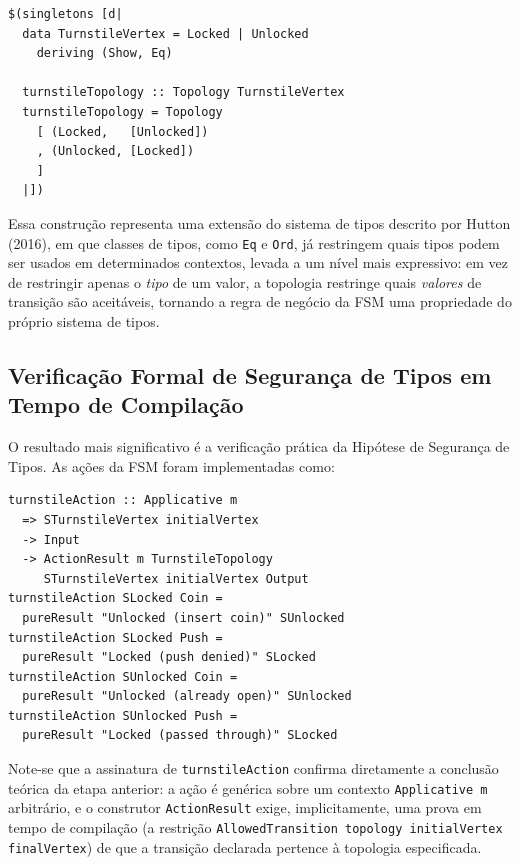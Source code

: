 \documentclass[12pt,a4paper]{article}
\begin{document}
\begin{verbatim}
$(singletons [d|
  data TurnstileVertex = Locked | Unlocked
    deriving (Show, Eq)

  turnstileTopology :: Topology TurnstileVertex
  turnstileTopology = Topology
    [ (Locked,   [Unlocked])
    , (Unlocked, [Locked])
    ]
  |])
\end{verbatim}

Essa construção representa uma extensão do sistema de tipos descrito por Hutton (2016), em que classes de tipos, como \texttt{Eq} e \texttt{Ord}, já restringem quais tipos podem ser usados em determinados contextos, levada a um nível mais expressivo: em vez de restringir apenas o \emph{tipo} de um valor, a topologia restringe quais \emph{valores} de transição são aceitáveis, tornando a regra de negócio da FSM uma propriedade do próprio sistema de tipos.

\subsection{Verificação Formal de Segurança de Tipos em Tempo de Compilação}

O resultado mais significativo é a verificação prática da Hipótese de Segurança de Tipos. As ações da FSM foram implementadas como:

\begin{verbatim}
turnstileAction :: Applicative m
  => STurnstileVertex initialVertex
  -> Input
  -> ActionResult m TurnstileTopology
     STurnstileVertex initialVertex Output
turnstileAction SLocked Coin =
  pureResult "Unlocked (insert coin)" SUnlocked
turnstileAction SLocked Push =
  pureResult "Locked (push denied)" SLocked
turnstileAction SUnlocked Coin =
  pureResult "Unlocked (already open)" SUnlocked
turnstileAction SUnlocked Push =
  pureResult "Locked (passed through)" SLocked
\end{verbatim}

Note-se que a assinatura de \texttt{turnstileAction} confirma diretamente a conclusão teórica da etapa anterior: a ação é genérica sobre um contexto \texttt{Applicative m} arbitrário, e o construtor \texttt{ActionResult} exige, implicitamente, uma prova em tempo de compilação (a restrição \texttt{AllowedTransition topology initialVertex finalVertex}) de que a transição declarada pertence à topologia especificada.
\end{document}
